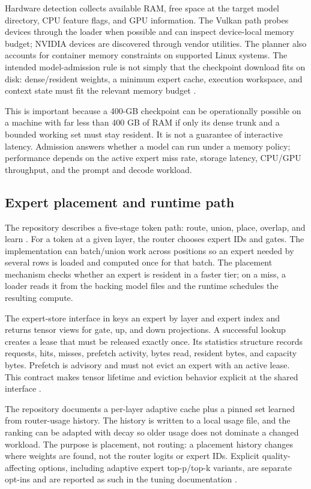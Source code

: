 \documentclass[10pt,twocolumn]{article}
\newcommand{\code}[1]{\texttt{\small\detokenize{#1}}}
\begin{document}
Hardware detection collects available RAM, free space at the target model directory, CPU feature flags, and GPU information. The Vulkan path probes devices through the loader when possible and can inspect device-local memory budget; NVIDIA devices are discovered through vendor utilities. The planner also accounts for container memory constraints on supported Linux systems. The intended model-admission rule is not simply that the checkpoint download fits on disk: dense/resident weights, a minimum expert cache, execution workspace, and context state must fit the relevant memory budget \cite{qoralishw,qoralisresource}.

This is important because a 400-GB checkpoint can be operationally possible on a machine with far less than 400 GB of RAM if only its dense trunk and a bounded working set must stay resident. It is not a guarantee of interactive latency. Admission answers whether a model can run under a memory policy; performance depends on the active expert miss rate, storage latency, CPU/GPU throughput, and the prompt and decode workload.

\subsection{Expert placement and runtime path}
The repository describes a five-stage token path: route, union, place, overlap, and learn \cite{qoralisreadme}. For a token at a given layer, the router chooses expert IDs and gates. The implementation can batch/union work across positions so an expert needed by several rows is loaded and computed once for that batch. The placement mechanism checks whether an expert is resident in a faster tier; on a miss, a loader reads it from the backing model files and the runtime schedules the resulting compute.

The expert-store interface in \code{c/expert_store.h} keys an expert by layer and expert index and returns tensor views for gate, up, and down projections. A successful lookup creates a lease that must be released exactly once. Its statistics structure records requests, hits, misses, prefetch activity, bytes read, resident bytes, and capacity bytes. Prefetch is advisory and must not evict an expert with an active lease. This contract makes tensor lifetime and eviction behavior explicit at the shared interface \cite{qoralisexpertstore}.

The repository documents a per-layer adaptive cache plus a pinned set learned from router-usage history. The history is written to a local usage file, and the ranking can be adapted with decay so older usage does not dominate a changed workload. The purpose is placement, not routing: a placement history changes where weights are found, not the router logits or expert IDs. Explicit quality-affecting options, including adaptive expert top-p/top-k variants, are separate opt-ins and are reported as such in the tuning documentation \cite{qoralisroute,qoralistuning}.
\end{document}
